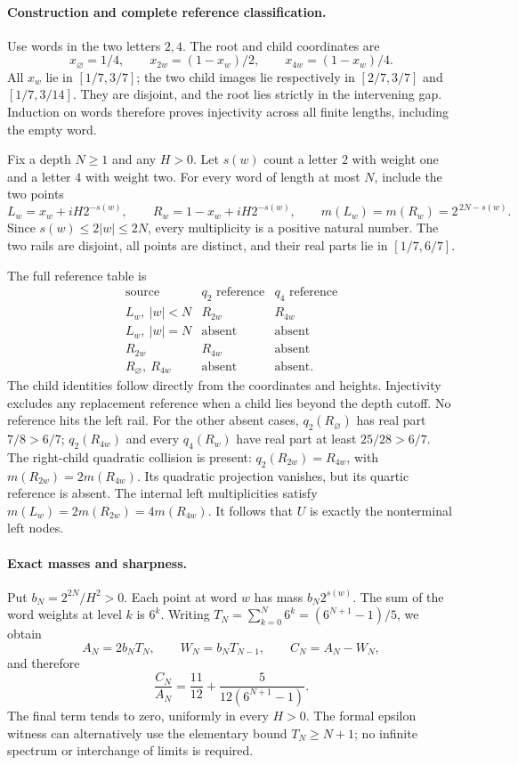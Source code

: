 \paragraph{Construction and complete reference classification.}
Use words in the two letters \(2,4\). The root and child coordinates are
\[
 x_{\varnothing}=1/4,\qquad
 x_{2w}=(1-x_w)/2,\qquad x_{4w}=(1-x_w)/4.
\]
All \(x_w\) lie in \([1/7,3/7]\); the two child images lie respectively
in \([2/7,3/7]\) and \([1/7,3/14]\). They are disjoint, and the root
lies strictly in the intervening gap. Induction on words therefore
proves injectivity across all finite lengths, including the empty word.

Fix a depth \(N\ge1\) and any \(H>0\). Let \(s(w)\) count a letter \(2\)
with weight one and a letter \(4\) with weight two. For every word of
length at most \(N\), include the two points
\[
 L_w=x_w+iH2^{-s(w)},\qquad
 R_w=1-x_w+iH2^{-s(w)},\qquad
 m(L_w)=m(R_w)=2^{\,2N-s(w)}.
\]
Since \(s(w)\le2|w|\le2N\), every multiplicity is a positive natural
number. The two rails are disjoint, all points are distinct, and their
real parts lie in \([1/7,6/7]\).

The full reference table is
\[
\begin{array}{c|cc}
 \text{source}&q_2\text{ reference}&q_4\text{ reference}\\ \hline
 L_w,\ |w|<N&R_{2w}&R_{4w}\\
 L_w,\ |w|=N&\text{absent}&\text{absent}\\
 R_{2w}&R_{4w}&\text{absent}\\
 R_{\varnothing},\ R_{4w}&\text{absent}&\text{absent}.
\end{array}
\]
The child identities follow directly from the coordinates and heights.
Injectivity excludes any replacement reference when a child lies beyond
the depth cutoff. No reference hits the left rail. For the other absent
cases, \(q_2(R_{\varnothing})\) has real part \(7/8>6/7\);
\(q_2(R_{4w})\) and every \(q_4(R_w)\) have real part at least
\(25/28>6/7\). The right-child quadratic collision is present:
\(q_2(R_{2w})=R_{4w}\), with
\(m(R_{2w})=2m(R_{4w})\). Its quadratic projection vanishes, but its
quartic reference is absent. The internal left multiplicities satisfy
\(m(L_w)=2m(R_{2w})=4m(R_{4w})\).
It follows that \(U\) is exactly the nonterminal left nodes.

\paragraph{Exact masses and sharpness.}
Put \(b_N=2^{2N}/H^2>0\). Each point at word \(w\) has mass
\(b_N2^{s(w)}\). The sum of the word weights at level \(k\) is \(6^k\).
Writing \(T_N=\sum_{k=0}^N6^k=(6^{N+1}-1)/5\), we obtain
\[
 A_N=2b_NT_N,\qquad W_N=b_NT_{N-1},\qquad C_N=A_N-W_N,
\]
and therefore
\begin{equation}\label{eq:dyadic-fixed-strip-ratio}
 \frac{C_N}{A_N}
 =\frac{11}{12}+\frac{5}{12(6^{N+1}-1)}.
\end{equation}
The final term tends to zero, uniformly in every \(H>0\).
The formal epsilon witness can alternatively use the elementary bound
\(T_N\ge N+1\); no infinite spectrum or interchange of limits is required.

